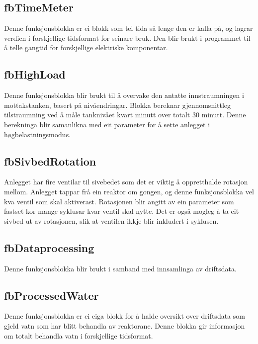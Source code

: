 \subsection{fbTimeMeter}
Denne funksjonsblokka er ei blokk som tel tida så lenge den er kalla på, og lagrar verdien i forskjellige tidsformat for seinare bruk.
Den blir brukt i programmet til å telle gangtid for forskjellige elektriske komponentar.

\newpage

\subsection{fbHighLoad}
Denne funksjonsblokka blir brukt til å overvake den antatte innstraumningen i mottakstanken, basert på nivåendringar.
Blokka bereknar gjennomsnittleg tilstraumning ved å måle tanknivået kvart minutt over totalt 30 minutt.
Denne berekninga blir samanlikna med eit parameter for å sette anlegget i høgbelastningsmodus.

\subsection{fbSivbedRotation}
Anlegget har fire ventilar til sivebedet som det er viktig å oppretthalde rotasjon mellom. Anlegget tappar frå ein reaktor om gongen, 
og denne funksjonsblokka vel kva ventil som skal aktiverast.
Rotasjonen blir angitt av ein parameter som fastset kor mange syklusar kvar ventil skal nytte. 
Det er også mogleg å ta eit sivbed ut av rotasjonen, slik at ventilen ikkje blir inkludert i syklusen.

\subsection{fbDataprocessing}
Denne funksjonsblokka blir brukt i samband med innsamlinga av driftsdata. 

\subsection{fbProcessedWater}
Denne funksjonsblokka er ei eiga blokk for å halde oversikt over driftsdata som gjeld vatn som har blitt behandla av reaktorane. 
Denne blokka gir informasjon om totalt behandla vatn i forskjellige tidsformat.

\newpage

